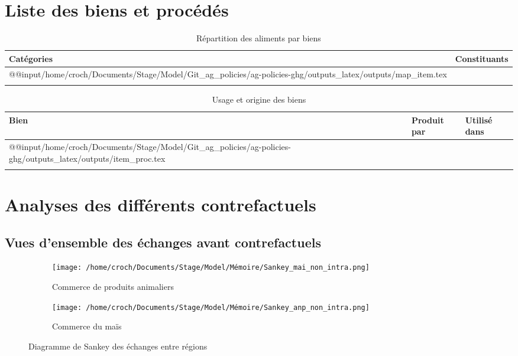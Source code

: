 \section{Liste des biens et procédés}\label{annexe:item_pord}

\begin{longtable}[h]{p{1.5in}p{4.5in}}
    \textbf{Catégories} & \textbf{Constituants} \\         \hline
    \endfirsthead
    \endhead
    \csname @@input\endcsname /home/croch/Documents/Stage/Model/Git_ag_policies/ag-policies-ghg/outputs_latex/outputs/map_item.tex
    \hline                                      \\
    \caption{Répartition des aliments par biens}
\end{longtable}

\begin{longtable}[h]{p{1.5in}p{2.5in}p{1.8in}}
    \textbf{Bien} & \textbf{Produit par} & \textbf{Utilisé dans} \\         \hline
    \endfirsthead
    \endhead
    \csname @@input\endcsname /home/croch/Documents/Stage/Model/Git_ag_policies/ag-policies-ghg/outputs_latex/outputs/item_proc.tex
    \hline                                                       \\
    \caption{Usage et origine des biens}
\end{longtable}

\newpage
\section{Analyses des différents contrefactuels}
\subsection{Vues d'ensemble des échanges avant contrefactuels}\label{annexe:sankey}

\begin{figure}[hbt!]
    \centering
    \begin{subfigure}[b]{0.495\textwidth}
        \centering
        \texttt{[image: /home/croch/Documents/Stage/Model/Mémoire/Sankey\_mai\_non\_intra.png]}
        \caption{Commerce de produits animaliers}
        \label{fig:sankey_anp}
    \end{subfigure}
    \begin{subfigure}[b]{0.495\textwidth}
        \centering
        \texttt{[image: /home/croch/Documents/Stage/Model/Mémoire/Sankey\_anp\_non\_intra.png]}
        \caption{Commerce du maïs}
        \label{fig:sankey_mai}
    \end{subfigure}
    \caption{Diagramme de Sankey des échanges entre régions}
    \label{fig:sankey_mai}
\end{figure}


